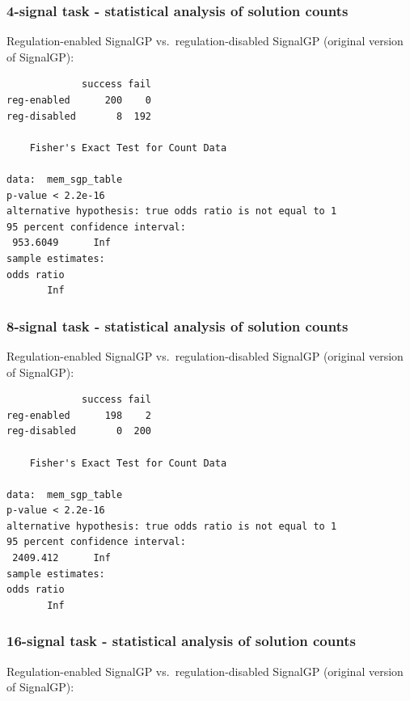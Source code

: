\documentclass[]{book}
\begin{document}
\hypertarget{signal-task---statistical-analysis-of-solution-counts-1}{%
\subsubsection{4-signal task - statistical analysis of solution counts}\label{signal-task---statistical-analysis-of-solution-counts-1}}

Regulation-enabled SignalGP vs.~regulation-disabled SignalGP (original version of SignalGP):

\begin{verbatim}
             success fail
reg-enabled      200    0
reg-disabled       8  192

    Fisher's Exact Test for Count Data

data:  mem_sgp_table
p-value < 2.2e-16
alternative hypothesis: true odds ratio is not equal to 1
95 percent confidence interval:
 953.6049      Inf
sample estimates:
odds ratio 
       Inf 
\end{verbatim}

\hypertarget{signal-task---statistical-analysis-of-solution-counts-2}{%
\subsubsection{8-signal task - statistical analysis of solution counts}\label{signal-task---statistical-analysis-of-solution-counts-2}}

Regulation-enabled SignalGP vs.~regulation-disabled SignalGP (original version of SignalGP):

\begin{verbatim}
             success fail
reg-enabled      198    2
reg-disabled       0  200

    Fisher's Exact Test for Count Data

data:  mem_sgp_table
p-value < 2.2e-16
alternative hypothesis: true odds ratio is not equal to 1
95 percent confidence interval:
 2409.412      Inf
sample estimates:
odds ratio 
       Inf 
\end{verbatim}

\hypertarget{signal-task---statistical-analysis-of-solution-counts-3}{%
\subsubsection{16-signal task - statistical analysis of solution counts}\label{signal-task---statistical-analysis-of-solution-counts-3}}

Regulation-enabled SignalGP vs.~regulation-disabled SignalGP (original version of SignalGP):
\end{document}

